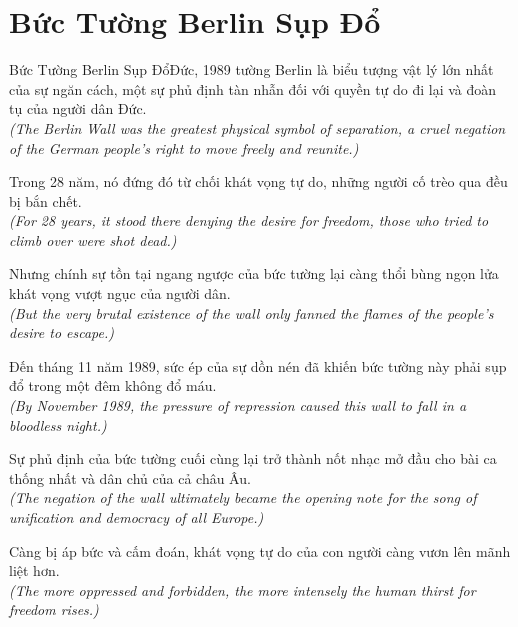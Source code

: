 \section{Bức Tường Berlin Sụp Đổ}
\begin{truyen}{Bức Tường Berlin Sụp Đổ}{Đức, 1989}
 tường Berlin là biểu tượng vật lý lớn nhất của sự ngăn cách, một sự phủ định tàn nhẫn đối với quyền tự do đi lại và đoàn tụ của người dân Đức.\\[4pt]
\textit{(The Berlin Wall was the greatest physical symbol of separation, a cruel negation of the German people's right to move freely and reunite.)}

Trong 28 năm, nó đứng đó từ chối khát vọng tự do, những người cố trèo qua đều bị bắn chết.\\[4pt]
\textit{(For 28 years, it stood there denying the desire for freedom, those who tried to climb over were shot dead.)}

Nhưng chính sự tồn tại ngang ngược của bức tường lại càng thổi bùng ngọn lửa khát vọng vượt ngục của người dân.\\[4pt]
\textit{(But the very brutal existence of the wall only fanned the flames of the people's desire to escape.)}

Đến tháng 11 năm 1989, sức ép của sự dồn nén đã khiến bức tường này phải sụp đổ trong một đêm không đổ máu.\\[4pt]
\textit{(By November 1989, the pressure of repression caused this wall to fall in a bloodless night.)}

Sự phủ định của bức tường cuối cùng lại trở thành nốt nhạc mở đầu cho bài ca thống nhất và dân chủ của cả châu Âu.\\[4pt]
\textit{(The negation of the wall ultimately became the opening note for the song of unification and democracy of all Europe.)}

\end{truyen}
\begin{baihoc}
  Càng bị áp bức và cấm đoán, khát vọng tự do của con người càng vươn lên mãnh liệt hơn.\\[4pt]
  \textit{(The more oppressed and forbidden, the more intensely the human thirst for freedom rises.)}
\end{baihoc}


